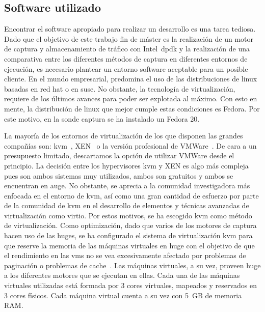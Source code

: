 \subsection{Software utilizado\label{sec:sw}}

Encontrar el software apropiado para realizar un desarrollo es una tarea tediosa. Dado que el objetivo de este trabajo fin de máster es la realización de un motor de captura y almacenamiento de tráfico con Intel~\gls{dpdk} y la realización de una comparativa entre los diferentes métodos de captura en diferentes entornos de ejecución, es necesario plantear un entorno software aceptable para un posible cliente.
%
En el mundo empresarial, predomina el uso de las distribuciones de linux basadas en red hat o en suse. No obstante, la tecnología de virtualización, requiere de los últimos avances para poder ser explotada al máximo. Con esto en mente, la distribución de linux que mejor cumple estas condiciones es Fedora. Por este motivo, en la sonde captura se ha instalado un Fedora 20.

La mayoría de los entornos de virtualización de los que disponen las grandes compañías son: \gls{kvm}~\cite{bib:kvm}, XEN~\cite{bib:xen} o la versión profesional de VMWare~\cite{bib:vmware}. De cara a un presupuesto limitado, descartamos la opción de utilizar VMWare desde el principio. La decisión entre los hypervisores \gls{kvm} y XEN es algo más compleja pues son ambos sistemas muy utilizados, ambos son gratuitos y ambos se encuentran en auge. No obstante, se aprecia a la comunidad investigadora más enfocada en el entorno de \gls{kvm}, así como una gran cantidad de esfuerzo por parte de la comunidad de \gls{kvm} en el desarrollo de elementos y técnicas avanzadas de virtualización como \gls{virtio}. Por estos motivos, se ha escogido \gls{kvm} como método de virtualización.
%
Como optimización, dado que varios de los motores de captura hacen uso de las \glspl{huge}, se ha configurado el sistema de virtualización \gls{kvm} para que reserve la memoria de las máquinas virtuales en \gls{huge} con el objetivo de que el rendimiento en las \glspl{vm} no se vea excesivamente afectado por problemas de paginación o problemas de cache~\cite{kudryastev2013pcs}. Las máquinas virtuales, a su vez, proveen \gls{huge} a los diferentes motores que se ejecutan en ellas.
%
Cada una de las máquinas virtuales utilizadas está formada por 3 \glspl{core} virtuales, mapeados y reservados en 3 \glspl{core} físicos. Cada máquina virtual cuenta a su vez con 5~GB de memoria RAM.

